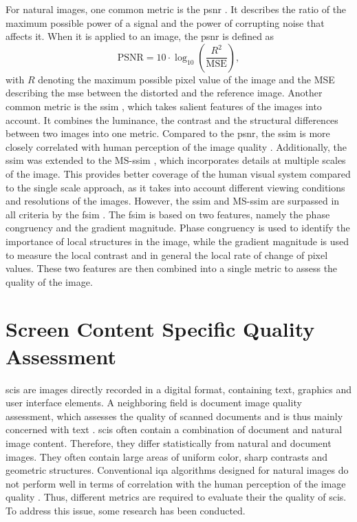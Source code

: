 For natural images, one common metric is the \gls{psnr} \cite{PSNRvsSSIM_2010}.
It describes the ratio of the maximum possible power of a signal and the power of corrupting noise that affects it.
When it is applied to an image, the \gls{psnr} is defined as
\begin{equation}
    \text{PSNR} = 10 \cdot \log_{10} \left( \frac{R^2}{\text{MSE}} \right),
    \label{eq:psnr}
\end{equation}
with \(R\) denoting the maximum possible pixel value of the image and the MSE describing the \gls{mse} between the distorted and the reference image.
Another common metric is the \gls{ssim} \cite{SSIM_2004}, which takes salient features of the images into account.
It combines the luminance, the contrast and the structural differences between two images into one metric.
Compared to the \gls{psnr}, the \gls{ssim} is more closely correlated with human perception of the image quality \cite{frmetric_comp_2012}.
Additionally, the \gls{ssim} was extended to the MS-\gls{ssim} \cite{ms_ssim_2003}, which incorporates details at multiple scales of the image.
This provides better coverage of the human visual system compared to the single scale approach, as it takes into account different viewing conditions and resolutions of the images.
However, the \gls{ssim} and MS-\gls{ssim} are surpassed in all criteria by the \gls{fsim} \cite{fsim_2011}.
The \gls{fsim} is based on two features, namely the phase congruency and the gradient magnitude.
Phase congruency is used to identify the importance of local structures in the image, while the gradient magnitude is used to measure the local contrast and in general the local rate of change of pixel values.
These two features are then combined into a single metric to assess the quality of the image.



\section{Screen Content Specific Quality Assessment}

\Glspl{sci} are images directly recorded in a digital format, containing text, graphics and user interface elements.
A neighboring field is document image quality assessment, which assesses the quality of scanned documents and is thus mainly concerned with text \cite{3_subj_weight_2015}.
\Glspl{sci} often contain a combination of document and natural image content.
Therefore, they differ statistically from natural and document images.
They often contain large areas of uniform color, sharp contrasts and geometric structures.
Conventional \gls{iqa} algorithms designed for natural images do not perform well in terms of correlation with the human perception of the image quality \cite{ni_scid_2017}.
Thus, different metrics are required to evaluate their the quality of \glspl{sci}.
To address this issue, some research has been conducted.

